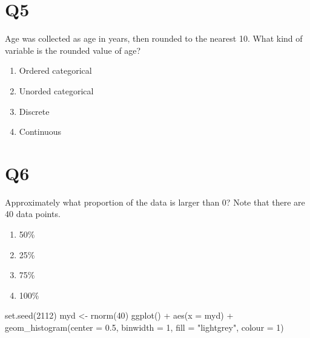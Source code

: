 \documentclass[
  letterpaper,
  DIV=11,
  numbers=noendperiod]{scrreprt}
\newenvironment{Shaded}{\begin{snugshade}}{\end{snugshade}}
\newcommand{\AttributeTok}[1]{\textcolor[rgb]{0.40,0.45,0.13}{#1}}
\newcommand{\DecValTok}[1]{\textcolor[rgb]{0.68,0.00,0.00}{#1}}
\newcommand{\FloatTok}[1]{\textcolor[rgb]{0.68,0.00,0.00}{#1}}
\newcommand{\FunctionTok}[1]{\textcolor[rgb]{0.28,0.35,0.67}{#1}}
\newcommand{\NormalTok}[1]{\textcolor[rgb]{0.00,0.23,0.31}{#1}}
\newcommand{\OtherTok}[1]{\textcolor[rgb]{0.00,0.23,0.31}{#1}}
\newcommand{\SpecialCharTok}[1]{\textcolor[rgb]{0.37,0.37,0.37}{#1}}
\newcommand{\StringTok}[1]{\textcolor[rgb]{0.13,0.47,0.30}{#1}}
\providecommand{\tightlist}{%
  \setlength{\itemsep}{0pt}\setlength{\parskip}{0pt}}\usepackage{longtable,booktabs,array}
\begin{document}
\hypertarget{q5}{%
\section{Q5}\label{q5}}

Age was collected as age in years, then rounded to the nearest 10. What
kind of variable is the rounded value of age?

\pspace

\begin{enumerate}
\def\labelenumi{\arabic{enumi}.}
\tightlist
\item
  Ordered categorical\lspace
\item
  Unorded categorical\lspace
\item
  Discrete\lspace
\item
  Continuous
\end{enumerate}

\hypertarget{q6}{%
\section{Q6}\label{q6}}

\vspace{1cm}

Approximately what proportion of the data is larger than 0? Note that
there are 40 data points.

\pspace

\begin{enumerate}
\def\labelenumi{\arabic{enumi}.}
\tightlist
\item
  50\%
\item
  25\%
\item
  75\%
\item
  100\%
\end{enumerate}

\begin{Shaded}
\begin{Highlighting}[]
\FunctionTok{set.seed}\NormalTok{(}\DecValTok{2112}\NormalTok{)}
\NormalTok{myd }\OtherTok{\textless{}{-}} \FunctionTok{rnorm}\NormalTok{(}\DecValTok{40}\NormalTok{)}
\FunctionTok{ggplot}\NormalTok{() }\SpecialCharTok{+} \FunctionTok{aes}\NormalTok{(}\AttributeTok{x =}\NormalTok{ myd) }\SpecialCharTok{+} \FunctionTok{geom\_histogram}\NormalTok{(}\AttributeTok{center =} \FloatTok{0.5}\NormalTok{, }\AttributeTok{binwidth =} \DecValTok{1}\NormalTok{, }\AttributeTok{fill =} \StringTok{"lightgrey"}\NormalTok{, }\AttributeTok{colour =} \DecValTok{1}\NormalTok{)}
\end{Highlighting}
\end{Shaded}
\end{document}
